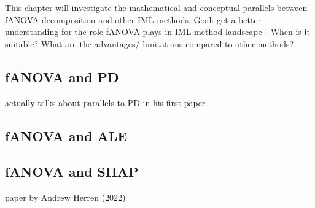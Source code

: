 This chapter will investigate the mathematical and conceptual parallels between fANOVA decomposition and other IML methods. Goal: get a better understanding for the role fANOVA plays in IML method landscape - When is it suitable? What are the advantages/ limitations compared to other methods?



\subsection{fANOVA and PD}
\cite{hooker_discovering_2004} actually talks about parallels to PD in his first paper

\subsection{fANOVA and ALE}

\subsection{fANOVA and SHAP}
paper by Andrew Herren (2022)